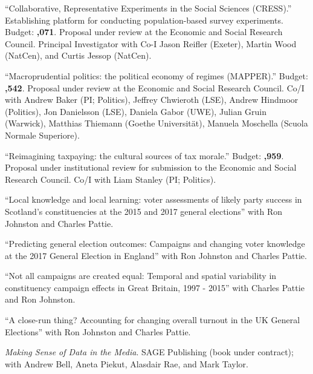 \documentclass[12pt]{article}
\begin{document}
\begin{bibsection}
 \item ``Collaborative, Representative Experiments in the Social Sciences (CRESS).'' Establishing platform for conducting population-based survey experiments. Budget: \textbf{,071}. Proposal under review at the Economic and Social Research Council. Principal Investigator with Co-I Jason Reifler (Exeter), Martin Wood (NatCen), and Curtis Jessop (NatCen).

\item ``Macroprudential politics: the political economy of regimes (MAPPER).'' Budget: \textbf{,542}. Proposal under review at the Economic and Social Research Council. Co\-/I with Andrew Baker (PI; Politics), Jeffrey Chwieroth (LSE), Andrew Hindmoor (Politics), Jon Danielsson (LSE), Daniela Gabor (UWE), Julian Gruin (Warwick), Matthias Thiemann (Goethe Universit\"at), Manuela Moschella (Scuola Normale Superiore). 

\item ``Reimagining taxpaying: the cultural sources of tax morale.'' Budget: \textbf{,959}. Proposal under institutional review for submission to the Economic and Social Research Council. Co\-/I with Liam Stanley (PI; Politics). 

\item ``Local knowledge and local learning: voter assessments of likely party success in Scotland's constituencies at the 2015 and 2017 general elections'' with Ron Johnston and Charles Pattie.

\item ``Predicting general election outcomes: Campaigns and changing voter knowledge at the 2017 General Election in England'' with Ron Johnston and Charles Pattie.

\item ``Not all campaigns are created equal: Temporal and spatial variability in constituency campaign effects in Great Britain, 1997 - 2015'' with Charles Pattie and Ron Johnston.

\item ``A close-run thing? Accounting for changing overall turnout in the UK General Elections'' with Ron Johnston and Charles Pattie.

\item \textit{Making Sense of Data in the Media}. SAGE Publishing (book under contract); with Andrew Bell, Aneta Piekut, Alasdair Rae, and Mark Taylor.

              
\end{bibsection}
\end{document}
